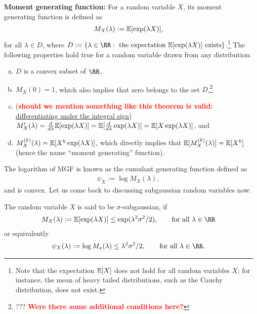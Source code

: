 \documentclass[twoside]{article}
\begin{document}
    \noindent \textbf{Moment generating function:} For a random variable $X$, its moment generating function is defined as
    \begin{align*}
      M_X(\lambda) := \mathbb{E}[\exp(\lambda X)],
    \end{align*}
    for all $\lambda \in D$, where $D := \{ \lambda \in \RR: \text{ the expectation } \EE{\exp(\lambda X)} \text{ exists}\}$.\footnote{Note that the expectation $\mathbb{E}[X]$ does not hold for all random variables $X$; for instance, the mean of heavy tailed distributions, such as the Cauchy distribution, does not exist.} The following properties hold true for a random variable drawn from any distribution:
    \begin{enumerate}[(a)]
    \item $D$ is a convex subset of $\RR$,
    \item $M_X(0) = 1$, which also implies that zero belongs to the set $D$,\footnote{??? \textbf{\textcolor{red}{Were there some additional conditions here?}}}
    \item (\textbf{\textcolor{red}{should we mention something like this theorem is valid:}} \href{https://en.wikipedia.org/wiki/Leibniz_integral_rule#Measure_theory_statement}{differentiating under the integral sign}) $M_X'(\lambda) = \frac{d}{d \lambda} \mathbb{E}[\exp(\lambda X)] = \mathbb{E}[\frac{d}{d \lambda} \exp(\lambda X)] = \mathbb{E}[X \exp(\lambda X)]$, and
    \item $M_X^{(k)}(\lambda) = \mathbb{E}[X^k \exp(\lambda X)]$, which directly implies that $\mathbb{E}[M_X^{(k)}(\lambda)] = \mathbb{E}[X^k]$ (hence the name ``moment generating'' function).
    \end{enumerate}
    The logarithm of MGF is known as the cumulant generating function defined as
    \begin{align*}
      \psi_X := \log M_X(\lambda),
    \end{align*}
    and is convex. Let us come back to discussing subgaussian random variables now.
    \begin{definition}
      The random variable $X$ is said to be $\sigma$-subgaussian, if
      \begin{align*}
        M_X(\lambda) := \EE{\exp(\lambda X)} \leq \exp(\lambda^2 \sigma^2 / 2), \qquad \text{for all } \lambda \in \RR
      \end{align*}
      or equivalently
      \begin{align*}
        \psi_X(\lambda) := \log M_x(\lambda) \leq \lambda^2 \sigma^2 / 2, \qquad \text{for all } \lambda \in \RR.
      \end{align*}
    \end{definition}
\end{document}
